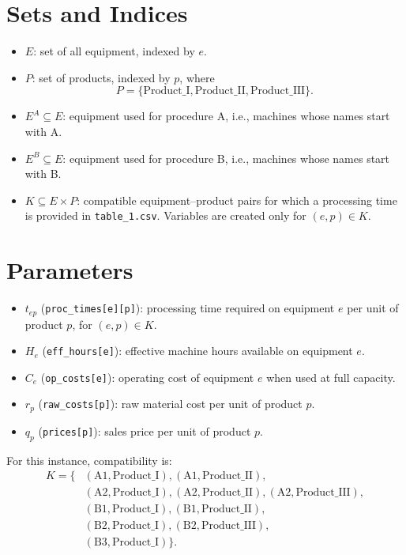\section*{Sets and Indices}

\begin{itemize}
    \item $E$: set of all equipment, indexed by $e$.
    \item $P$: set of products, indexed by $p$, where
    \[
    P=\{\text{Product\_I},\text{Product\_II},\text{Product\_III}\}.
    \]
    \item $E^A \subseteq E$: equipment used for procedure A, i.e., machines whose names start with A.
    \item $E^B \subseteq E$: equipment used for procedure B, i.e., machines whose names start with B.
    \item $K \subseteq E \times P$: compatible equipment--product pairs for which a processing time is provided in \texttt{table\_1.csv}. Variables are created only for $(e,p)\in K$.
\end{itemize}

\section*{Parameters}

\begin{itemize}
    \item $t_{ep}$ (\texttt{proc\_times[e][p]}): processing time required on equipment $e$ per unit of product $p$, for $(e,p)\in K$.
    \item $H_e$ (\texttt{eff\_hours[e]}): effective machine hours available on equipment $e$.
    \item $C_e$ (\texttt{op\_costs[e]}): operating cost of equipment $e$ when used at full capacity.
    \item $r_p$ (\texttt{raw\_costs[p]}): raw material cost per unit of product $p$.
    \item $q_p$ (\texttt{prices[p]}): sales price per unit of product $p$.
\end{itemize}

For this instance, compatibility is:
\[
\begin{aligned}
K=\{&(\text{A1},\text{Product\_I}),(\text{A1},\text{Product\_II}),\\
&(\text{A2},\text{Product\_I}),(\text{A2},\text{Product\_II}),(\text{A2},\text{Product\_III}),\\
&(\text{B1},\text{Product\_I}),(\text{B1},\text{Product\_II}),\\
&(\text{B2},\text{Product\_I}),(\text{B2},\text{Product\_III}),\\
&(\text{B3},\text{Product\_I})\}.
\end{aligned}
\]

